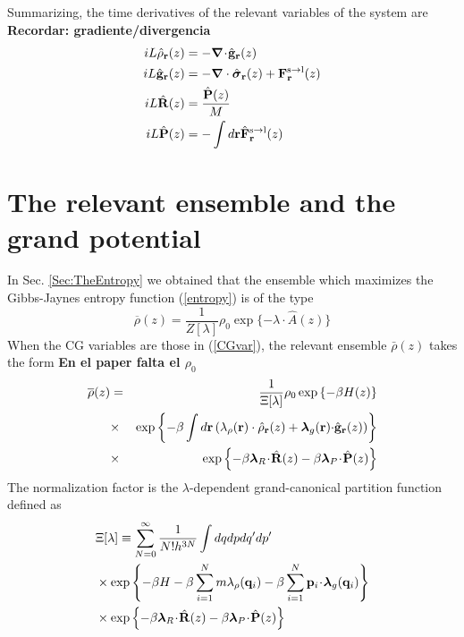 \documentclass[b5paper,openright,11pt]{book}
\newcommand{\esc}{\!\cdot\!}
\newcommand{\Note}[1]{{\bf \color{red}#1}}    %
\begin{document}
Summarizing, the time derivatives of the relevant variables of the system are
\Note{Recordar: gradiente/divergencia}
\begin{align}
    iL \hat{\rho}_{\bf r}(z) &= -\boldsymbol{\nabla}\esc\hat{\bf g}_{\bf r}(z)
\nonumber\\
iL\hat{\bf g}_{\bf r}(z)
&=-\boldsymbol{\nabla}\cdot \hat{\boldsymbol{\sigma}}_{\bf r}(z)+{\bf F}^{\rm s\to l}_{\bf r}(z) \nonumber \\
    iL\hat{\bf R}(z) &=\frac{\hat{\bf P}(z)}{M}
  \nonumber\\
    iL\hat{\bf P}(z) &=-\int  d{\bf r} \hat{\bf F}^{\rm s\to l}_{\bf r}(z)
   \label{timeDerivatives}  
\end{align}

\section{The relevant ensemble and the grand potential}
In Sec. \ref{Sec:TheEntropy} we obtained that the ensemble which maximizes the Gibbs-Jaynes entropy function (\ref{entropy}) is of the type
\begin{equation}
\overline{\rho}(z) = \frac{1}{Z[\lambda]} \rho_0\exp\{-\lambda\!\cdot\!\hat{A}(z)\}
\end{equation}
When the CG variables are those in (\ref{CGvar}), the relevant ensemble $\bar{\rho}(z)$ takes the form \Note{En el paper falta el $\rho_0$}
\begin{eqnarray}
  \overline{\rho}(z)&=&\frac{1}{\Xi[\lambda]}\rho_0\exp\left\{-\beta H(z)\right\}
\nonumber\\
&\times&
\exp\left\{-\beta\int d{\bf r}\left(\lambda_\rho({\bf r})\cdot\hat{\rho}_{\bf
    r}(z)+\boldsymbol{\lambda}_g{({\bf r})\cdot}\hat{\bf g}_{\bf r}(z)\right)\right\}
\nonumber\\
&\times&
\exp\left\{-\beta \boldsymbol{\lambda}_{R}\esc\hat{\bf R}(z)
-\beta \boldsymbol{\lambda}_{P}\esc\hat{\bf P}(z)\right\}
\nonumber\\
\label{relensln}
\end{eqnarray}
The   normalization   factor   is  the   $\lambda$-dependent
grand-canonical partition function defined as
\begin{align}
&\Xi[\lambda]
\equiv
 \sum_{N=0}^\infty \frac{1}{N!h^{3N}}
\int dqdp dq'dp'
\nonumber\\
&\times\exp\left\{-\beta H-\beta \sum_{i=1}^Nm \lambda_\rho({\bf
    q}_i)-\beta \sum_{i=1}^N{\bf p}_i\esc\boldsymbol{\lambda}_g({\bf q}_i)\right\}
\nonumber\\
&\times\exp\left\{-\beta \boldsymbol{\lambda}_{R}\esc\hat{\bf R}(z)
-\beta \boldsymbol{\lambda}_{P}\esc\hat{\bf P}(z)\right\}
\label{xiln}
\end{align}
\end{document}
